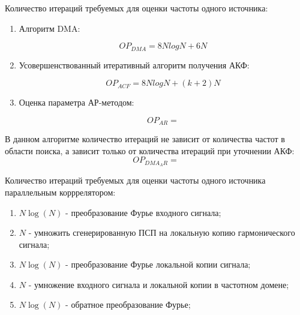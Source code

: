 Количество итераций требуемых для оценки частоты одного источника:
\begin{enumerate}
\item Алгоритм DMA:
	\begin{center}
	\begin{equation}
		OP_{DMA} = 8NlogN + 6N
	\end{equation}
	\end{center}
\item Усовершенствованный итеративный алгоритм получения АКФ:
	\begin{center}
	\begin{equation}
		OP_{ACF} = 8NlogN + (k+2)N
	\end{equation}
	\end{center}
\item Оценка параметра АР-методом:
	\begin{center}
	\begin{equation}
		OP_{AR} = 
	\end{equation}
	\end{center}
\end{enumerate}

В данном алгоритме количество итераций не зависит от количества частот в области поиска,
а зависит только от количества итераций при уточнении  АКФ:
\begin{equation}
	OP_{DMA_AR} =  
\end{equation}

Количество итераций требуемых для оценки частоты одного источника параллельным корррелятором:
\begin{enumerate}
	\item ${N \log (N)}$ - преобразование Фурье входного сигнала;
	\item ${N}$ - умножить сгенерированную ПСП на локальную копию гармонического сигнала;
	\item ${N \log (N)}$ - преобразование Фурье локальной копии сигнала;
	\item ${N}$ - умножение входного сигнала и локальной копии в частотном домене;
	\item ${N \log (N)}$ - обратное преобразование Фурье;
\end{enumerate}

